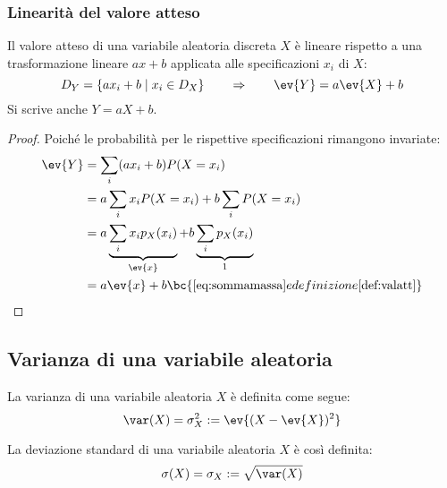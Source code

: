 \subsubsection{Linearità del valore atteso}
\begin{prop}
	Il valore atteso di una variabile aleatoria discreta $X$ è lineare rispetto a una trasformazione lineare $ax+b$ applicata alle specificazioni $x_i$ di $X$:
	\begin{equation*}
		D_Y = \{ax_i+b \mid x_i\in D_X\} \qquad\Rightarrow\qquad \ev{Y}=a\ev{X}+b
	\end{equation*}
	Si scrive anche $Y=aX+b$.
\end{prop}
\begin{proof}
	Poiché le probabilità per le rispettive specificazioni rimangono invariate:
	\begin{align*}
		\ev{Y} & = \sum_i (a x_i + b) P(X=x_i)                                                    \\
		       & = a\sum_i x_i P(X=x_i) + b\sum_i P(X=x_i)                                        \\
		       & = a\underbrace{\sum_i x_i p_X(x_i)}_{\ev{x}} + b\underbrace{\sum_i p_X(x_i)}_{1} \\
		       & = a \ev{x} + b \bc{\eqref{eq:sommamassa} e definizione \ref{def:valatt}}
	\end{align*}
\end{proof}



\subsection{Varianza di una variabile aleatoria}
\begin{defin} \label{def:var}
	La varianza di una variabile aleatoria $X$ è definita come segue:
	\begin{equation*}
		\var(X) = \sigma^2_X := \ev{(X-\ev{X})^2}
	\end{equation*}
\end{defin}

\begin{defin}
	La deviazione standard di una variabile aleatoria $X$ è così definita:
	\begin{equation*}
		\sigma(X) = \sigma_X :=\sqrt{\var(X)}
	\end{equation*}
\end{defin}


